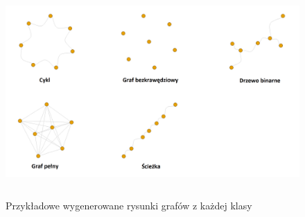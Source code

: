\begin{figure}[ht]
	\centering
	\includegraphics[height=8cm]{resources/model/images/gen-graphs-generated.png}
	\caption{Przykładowe wygenerowane rysunki grafów z każdej klasy}
	\label{Fig:tests-generation-1}
\end{figure}
\FloatBarrier